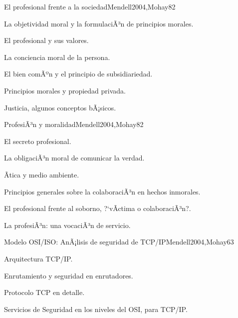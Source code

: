 \begin{syllabus}
\begin{outcomes}
\end{outcomes}

\begin{unit}{El profesional frente a la sociedad}{Mendell2004,Mohay}{8}{2}
\begin{topics}
      \item {La objetividad moral y la formulaciÃ³n de principios morales.}
      \item {El profesional y sus valores.}
      \item {La conciencia moral de la persona.}
      \item {El bien comÃºn y el principio de subsidiariedad.}
      \item {Principios morales y propiedad privada.}
      \item {Justicia, algunos conceptos bÃ¡sicos.}
\end{topics}
\end{unit}

\begin{unit}{ProfesiÃ³n y moralidad}{Mendell2004,Mohay}{8}{2}
\begin{topics}
      \item {El secreto profesional.}
      \item {La obligaciÃ³n moral de comunicar la verdad.}
      \item {Ãtica y medio ambiente.}
      \item {Principios generales sobre la colaboraciÃ³n en hechos inmorales.}
      \item {El profesional frente al soborno, ?`vÃ­ctima o colaboraciÃ³n?.}
      \item {La profesiÃ³n: una vocaciÃ³n de servicio.}
\end{topics}
\end{unit}

\begin{unit}{Modelo OSI/ISO: AnÃ¡lisis de seguridad de TCP/IP}{Mendell2004,Mohay}{6}{3}
\begin{topics}
      \item {Arquitectura TCP/IP.}
      \item {Enrutamiento y seguridad en enrutadores.}
      \item {Protocolo TCP en detalle.}
      \item {Servicios de Seguridad en los niveles del OSI, para TCP/IP.}
\end{topics}
\end{unit}


\end{syllabus}
